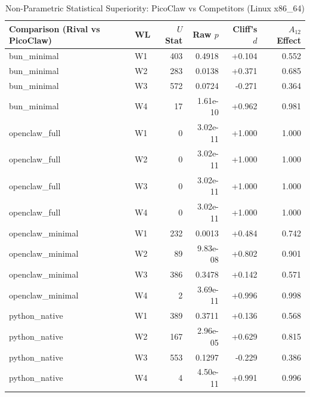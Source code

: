 \begin{table}[t]
\centering\small
\caption{Non-Parametric Statistical Superiority: PicoClaw vs Competitors (Linux x86_64)}
\label{tab:linux_stat_tests}
\begin{tabular}{llrrrr}
\toprule
Comparison (Rival vs PicoClaw) & WL & $U$ Stat & Raw $p$ & Cliff's $d$ & $A_{12}$ Effect \\
\midrule
bun\_minimal & W1 & 403 & 0.4918 & +0.104 & 0.552 \\
bun\_minimal & W2 & 283 & 0.0138 & +0.371 & 0.685 \\
bun\_minimal & W3 & 572 & 0.0724 & -0.271 & 0.364 \\
bun\_minimal & W4 & 17 & 1.61e-10 & +0.962 & 0.981 \\
openclaw\_full & W1 & 0 & 3.02e-11 & +1.000 & 1.000 \\
openclaw\_full & W2 & 0 & 3.02e-11 & +1.000 & 1.000 \\
openclaw\_full & W3 & 0 & 3.02e-11 & +1.000 & 1.000 \\
openclaw\_full & W4 & 0 & 3.02e-11 & +1.000 & 1.000 \\
openclaw\_minimal & W1 & 232 & 0.0013 & +0.484 & 0.742 \\
openclaw\_minimal & W2 & 89 & 9.83e-08 & +0.802 & 0.901 \\
openclaw\_minimal & W3 & 386 & 0.3478 & +0.142 & 0.571 \\
openclaw\_minimal & W4 & 2 & 3.69e-11 & +0.996 & 0.998 \\
python\_native & W1 & 389 & 0.3711 & +0.136 & 0.568 \\
python\_native & W2 & 167 & 2.96e-05 & +0.629 & 0.815 \\
python\_native & W3 & 553 & 0.1297 & -0.229 & 0.386 \\
python\_native & W4 & 4 & 4.50e-11 & +0.991 & 0.996 \\
\bottomrule
\end{tabular}
\end{table}
